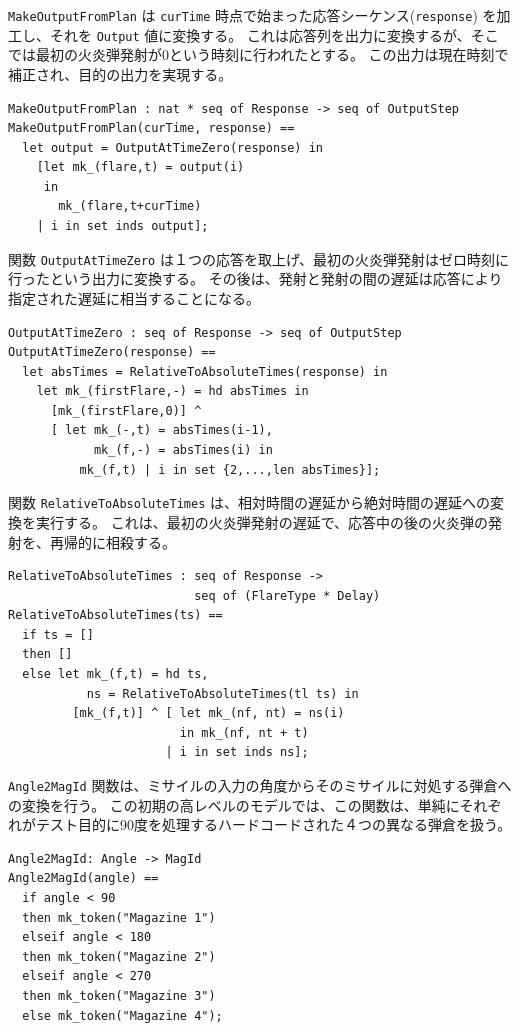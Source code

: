 \documentclass[\pformat,12pt]{jreport}
\begin{document}
\texttt{MakeOutputFromPlan} は \texttt{curTime} 時点で始まった応答シーケンス(\texttt{response}) を加工し、それを \texttt{Output} 値に変換する。 
これは応答列を出力に変換するが、そこでは最初の火炎弾発射が0という時刻に行われたとする。
この出力は現在時刻で補正され、目的の出力を実現する。

\begin{lstlisting}
MakeOutputFromPlan : nat * seq of Response -> seq of OutputStep
MakeOutputFromPlan(curTime, response) ==
  let output = OutputAtTimeZero(response) in
    [let mk_(flare,t) = output(i)
     in
       mk_(flare,t+curTime)
    | i in set inds output];
\end{lstlisting}

関数 \texttt{OutputAtTimeZero} は１つの応答を取上げ、最初の火炎弾発射はゼロ時刻に行ったという出力に変換する。
その後は、発射と発射の間の遅延は応答により指定された遅延に相当することになる。

\begin{lstlisting}
OutputAtTimeZero : seq of Response -> seq of OutputStep
OutputAtTimeZero(response) ==
  let absTimes = RelativeToAbsoluteTimes(response) in
    let mk_(firstFlare,-) = hd absTimes in
      [mk_(firstFlare,0)] ^
      [ let mk_(-,t) = absTimes(i-1),
            mk_(f,-) = absTimes(i) in
          mk_(f,t) | i in set {2,...,len absTimes}];
\end{lstlisting}

関数 \texttt{RelativeToAbsoluteTimes} は、相対時間の遅延から絶対時間の遅延への変換を実行する。
これは、最初の火炎弾発射の遅延で、応答中の後の火炎弾の発射を、再帰的に相殺する。
\newpage

\begin{lstlisting}
RelativeToAbsoluteTimes : seq of Response -> 
                          seq of (FlareType * Delay)
RelativeToAbsoluteTimes(ts) ==
  if ts = []
  then []
  else let mk_(f,t) = hd ts,
           ns = RelativeToAbsoluteTimes(tl ts) in
         [mk_(f,t)] ^ [ let mk_(nf, nt) = ns(i)
                        in mk_(nf, nt + t)
                      | i in set inds ns];
\end{lstlisting}

\texttt{Angle2MagId} 関数は、ミサイルの入力の角度からそのミサイルに対処する弾倉への変換を行う。
この初期の高レベルのモデルでは、この関数は、単純にそれぞれがテスト目的に90度を処理するハードコードされた４つの異なる弾倉を扱う。

\begin{lstlisting}
Angle2MagId: Angle -> MagId
Angle2MagId(angle) ==
  if angle < 90
  then mk_token("Magazine 1")
  elseif angle < 180
  then mk_token("Magazine 2")
  elseif angle < 270
  then mk_token("Magazine 3")
  else mk_token("Magazine 4");
\end{lstlisting}
\end{document}

